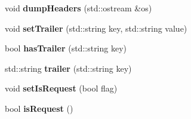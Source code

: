 \begin{DoxyCompactItemize}
\item 
\mbox{\label{class_message_base_a51e1e421b8938dc569ee5c6dea432ff7}} 
void {\bfseries dump\+Headers} (std\+::ostream \&os)
\item 
\mbox{\label{class_message_base_aa94bd648691d59a9848716bd9bd244ee}} 
void {\bfseries set\+Trailer} (std\+::string key, std\+::string value)
\item 
\mbox{\label{class_message_base_af8c76e1d4d2e6fcb2250ed7f32f3538b}} 
bool {\bfseries has\+Trailer} (std\+::string key)
\item 
\mbox{\label{class_message_base_a8c80bb7c6504c19c78741fb92d97ef72}} 
std\+::string {\bfseries trailer} (std\+::string key)
\item 
\mbox{\label{class_message_base_acb033494a6cd68256589232ceea2ab09}} 
void {\bfseries set\+Is\+Request} (bool flag)
\item 
\mbox{\label{class_message_base_aed6742887d171862fd53d747d813491d}} 
bool {\bfseries is\+Request} ()
\end{DoxyCompactItemize}
